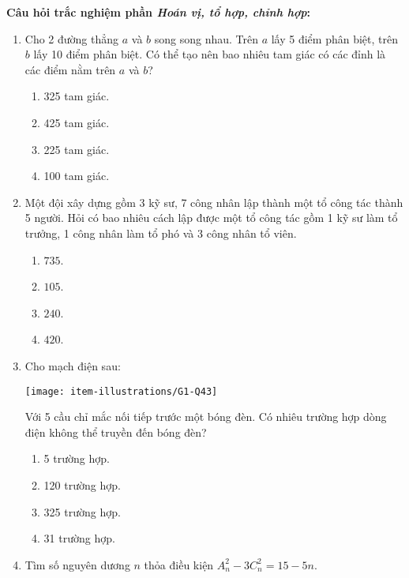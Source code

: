 \noindent\textbf{Câu hỏi trắc nghiệm phần \textit{Hoán vị, tổ hợp, chỉnh hợp}:}\par
\begin{enumerate}[label=\textbf{Câu \arabic*.},align=left,left=0cm..0cm,itemindent=*]
	\item Cho 2 đường thẳng $a$ và $b$ song song nhau. Trên $a$ lấy 5 điểm phân biệt, trên $b$ lấy 10 điểm phân biệt. Có thể tạo nên bao nhiêu tam giác có các đỉnh là các điểm nằm trên $a$ và $b$?
	\begin{enumerate}[label=\textbf{\Alph*.},align=left,left=1cm..0cm,itemindent=*]
		\item 325 tam giác. \item 425 tam giác. \item 225 tam giác. \item 100 tam giác.
	\end{enumerate}
	\item Một đội xây dựng gồm 3 kỹ sư, 7 công nhân lập thành một tổ công tác thành 5 người. Hỏi có bao nhiêu cách lập được một tổ công tác gồm 1 kỹ sư làm tổ trưởng, 1 công nhân làm tổ phó và 3 công nhân tổ viên.
	\begin{multicols}{4}\begin{enumerate}[label=\textbf{\Alph*.},align=left,left=1cm..0cm,itemindent=*]
		\item $735$. \item $105$. \item $240$. \item $420$.
	\end{enumerate}\end{multicols}
	\item Cho mạch điện sau:\par
	{\centering\texttt{[image: item-illustrations/G1-Q43]}\par}
	Với 5 cầu chỉ mắc nối tiếp trước một bóng đèn. Có nhiêu trường hợp dòng điện không thể truyền đến bóng đèn?
	\begin{enumerate}[label=\textbf{\Alph*.},align=left,left=1cm..0cm,itemindent=*]
		\item 5 trường hợp. \item 120 trường hợp. \item 325 trường hợp. \item 31 trường hợp.
	\end{enumerate}
	\item Tìm số nguyên dương $n$ thỏa điều kiện $A_{n}^{2}-3C_{n}^{2}=15-5n$.
	\begin{enumerate}[label=\textbf{\Alph*.},align=left,left=1cm..0cm,itemindent=*]

\end{enumerate}
\end{enumerate}
